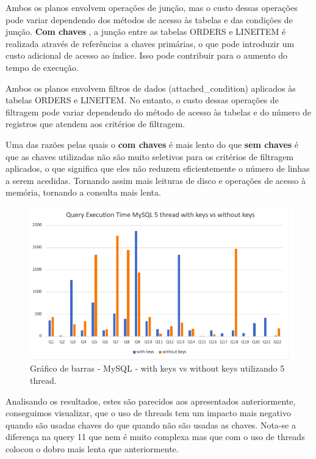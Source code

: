 \documentclass{article}
\begin{document}
Ambos os planos envolvem operações de junção, mas o custo dessas operações pode variar dependendo dos métodos de acesso às tabelas e das condições de junção. \textbf{Com chaves} , a junção entre as tabelas ORDERS e LINEITEM é realizada através de referências a chaves primárias, o que pode introduzir um custo adicional de acesso ao índice. Isso pode contribuir para o aumento do tempo de execução.

Ambos os planos envolvem filtros de dados (attached\_condition) aplicados às tabelas ORDERS e LINEITEM. No entanto, o custo dessas operações de filtragem pode variar dependendo do método de acesso às tabelas e do número de registros que atendem aos critérios de filtragem.

Uma das razões pelas quais o \textbf{com chaves} é mais lento do que \textbf{sem chaves} é que as chaves utilizadas não são muito seletivos para os critérios de filtragem aplicados, o que significa que eles não reduzem eficientemente o número de linhas a serem acedidas. Tornando assim mais leituras de disco e operações de acesso à memória, tornando a consulta mais lenta.



\begin{figure}[H]
  \centering
  \includegraphics[width=\textwidth]{Graphs/mysql5threads_withkeys_withoutkeys.png}
  \caption{Gráfico de barras - MySQL - with keys vs without keys utilizando 5 thread.} 
  \label{fig:PKCreation2}
\end{figure}

Analisando os resultados, estes são parecidos aos apresentados anteriormente, conseguimos visualizar, que o uso de threads tem um impacto mais negativo quando são usadas chaves do que quando não são usadas as chaves. Nota-se a diferença na query 11 que nem é muito complexa mas que com o uso de threads colocou o dobro mais lenta que anteriormente.
\end{document}
